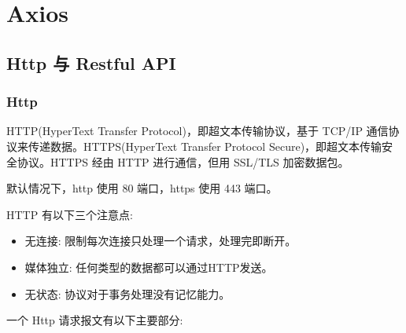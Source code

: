 \section{Axios}

\subsection{Http 与 Restful API}

\subsubsection*{Http}

HTTP(HyperText Transfer Protocol)，即超文本传输协议，基于 TCP/IP 通信协议来传递数据。HTTPS(HyperText Transfer Protocol Secure)，即超文本传输安全协议。HTTPS 经由 HTTP 进行通信，但用 SSL/TLS 加密数据包。

默认情况下，http 使用 80 端口，https 使用 443 端口。

HTTP 有以下三个注意点:
\begin{itemize}
  \item 无连接: 限制每次连接只处理一个请求，处理完即断开。
  \item 媒体独立: 任何类型的数据都可以通过HTTP发送。
  \item 无状态: 协议对于事务处理没有记忆能力。
\end{itemize}

一个 Http 请求报文有以下主要部分:

